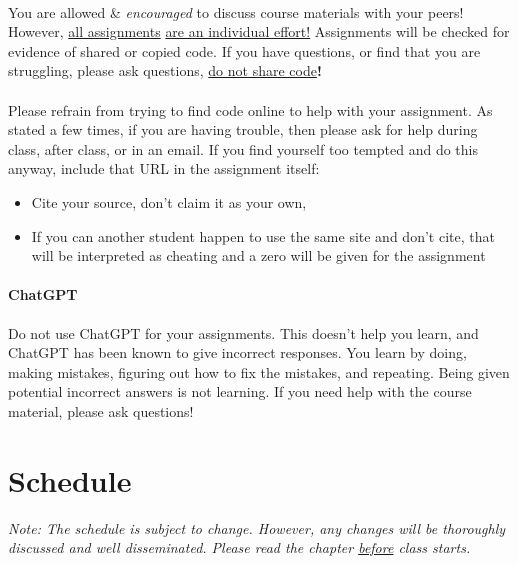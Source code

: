\documentclass[letter,10pt]{article}
\begin{document}
\paragraph{}You are allowed \& \textit{encouraged} to discuss course materials with your peers! However, \underline{all assignments} \underline{are an individual effort!} Assignments will be checked for evidence of shared or copied code. If you have questions, or find that you are struggling, please ask questions, \underline{do not share code}\textbf{!}

\paragraph{}Please refrain from trying to find code online to help with your assignment. As stated a few times, if you are having trouble, then please ask for help during class, after class, or in an email. If you find yourself too tempted and do this anyway, include that URL in the assignment itself:
\begin{itemize}
\item Cite your source, don't claim it as your own,
\item If you can another student happen to use the same site and don't cite, that will be interpreted as cheating and a zero will be given for the assignment
\end{itemize}

\paragraph{ChatGPT}Do not use ChatGPT for your assignments. This doesn't help you learn, and ChatGPT has been known to give incorrect responses. You learn by doing, making mistakes, figuring out how to fix the mistakes, and repeating. Being given potential incorrect answers is not learning. If you need help with the course material, please ask questions!

\section*{Schedule}\label{sec:schedule}
\textit{Note: The schedule is subject to change. However, any changes will be thoroughly discussed and well disseminated. Please read the chapter \underline{before} class starts.}
\end{document}
